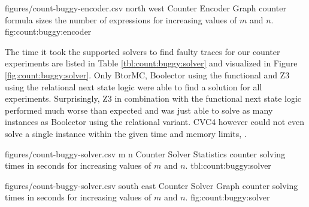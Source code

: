 \newpage

\EncoderStatsGraph
  {figures/count-buggy-encoder.csv}
  {north west}
  { Counter Encoder Graph}
  { counter formula sizes  the number of expressions for increasing values of $m$ and $n$.}
  {fig:count:buggy:encoder}

The time it took the supported solvers to find faulty traces for our  counter experiments are listed in Table \ref{tbl:count:buggy:solver} and visualized in Figure \ref{fig:count:buggy:solver}.
Only BtorMC, Boolector using the functional and Z3 using the relational next state logic were able to find a solution for all experiments.
Surprisingly, Z3 in combination with the functional next state logic performed much worse than expected and was just able to solve as many instances as Boolector using the relational variant.
CVC4 however could not even solve a single instance within the given time and memory limits, .

\bigbreak

\SolverStatsTable
  {figures/count-buggy-solver.csv}
  {m n}
  {\CountRowHeader}
  { Counter Solver Statistics}
  { counter solving times in seconds for increasing values of $m$ and $n$.}
  {tbl:count:buggy:solver}

\newpage

\SolverStatsGraph
  {figures/count-buggy-solver.csv}
  {south east}
  { Counter Solver Graph}
  { counter solving times in seconds for increasing values of $m$ and $n$.}
  {fig:count:buggy:solver}


